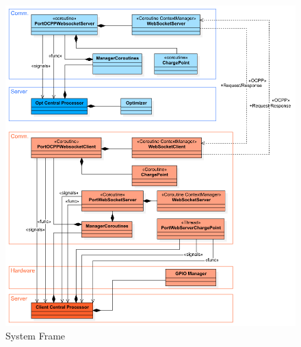 \documentclass[
english,
ruledheaders=section,%
class=report,%
thesis={type=Report},%
accentcolor=9c,%
custommargins=true,%
marginpar=false,%
parskip=half-,%
fontsize=11pt,%
logofile={img/tuda_logo.pdf}, %
]{tudapub}
\begin{document}
    \begin{figure}
        \centering
        \includegraphics[width=1\textwidth]{img/SimpleClassDiagram.png}
        \caption{System Frame}
        \label{fig:SystemFrame}
    \end{figure}


\end{document}
